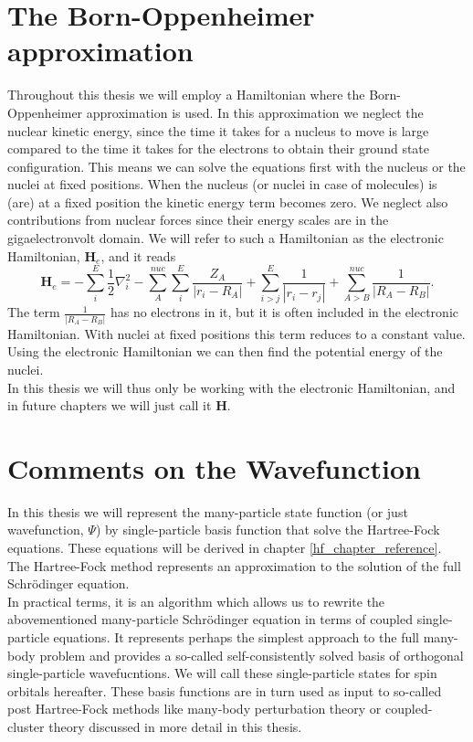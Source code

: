 \documentclass[a4paper,norsk,11pt,twoside]{report}
\begin{document}
\section{The Born-Oppenheimer approximation}
Throughout this thesis we will employ a Hamiltonian where the
Born-Oppenheimer approximation is used.  In this approximation we
neglect the nuclear kinetic energy, since the time it takes for a
nucleus to move is large compared to the time it takes for the
electrons to obtain their ground state configuration. This means we
can solve the equations first with the nucleus or the nuclei at fixed
positions. When the nucleus (or nuclei in case of molecules) is (are)
at a fixed position the kinetic energy term becomes zero. We neglect
also contributions from nuclear forces since their energy scales are
in the gigaelectronvolt domain. We will refer to such a Hamiltonian as
the electronic Hamiltonian, $\textbf{H}_e$, and it reads
\begin{equation}
\textbf{H}_e = - \sum_i^E \frac{1}{2} \nabla_i^2
- \sum_A^{nuc} \sum_i^E \frac{Z_A}{|r_i - R_A|}
+ \sum_{i>j}^E \frac{1}{|r_i - r_j|}
+ \sum_{A>B}^{nuc} \frac{1}{|R_A - R_B|}.
\end{equation}
The term $\frac{1}{|R_A - R_B|}$ has no electrons in it, but it is
often included in the electronic Hamiltonian. With nuclei at fixed
positions this term reduces to a constant value. Using the
electronic Hamiltonian we can then find the potential energy of the
nuclei. \\

In this thesis we will thus only be working with the electronic
Hamiltonian, and in future chapters we will just call it $\textbf{H}$.

\section{Comments on the Wavefunction}
In this thesis we will represent the many-particle state function (or just wavefunction, $\Psi$) by single-particle basis function that solve the Hartree-Fock equations. These equations will be derived in chapter \ref{hf_chapter_reference}. The Hartree-Fock method represents an
approximation to the solution of the full Schr\"odinger equation. \\

In
practical terms, it is an algorithm which allows us to rewrite the abovementioned many-particle Schr\"odinger 
equation in terms of coupled single-particle equations. It represents perhaps the simplest approach to the 
full many-body problem and provides a so-called self-consistently solved  basis of orthogonal single-particle wavefucntions. We will call these single-particle states for spin orbitals hereafter. 
These basis functions are in turn used as input to so-called post Hartree-Fock methods like many-body perturbation
theory or coupled-cluster theory discussed in more detail in this thesis. \\
\end{document}
